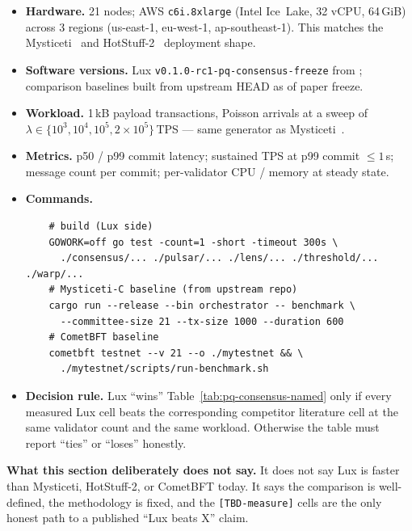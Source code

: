 \begin{itemize}[leftmargin=2em,nosep]
  \item \textbf{Hardware.} 21 nodes; AWS \texttt{c6i.8xlarge} (Intel
        Ice~Lake, 32 vCPU, 64\,GiB) across 3 regions (us-east-1, eu-west-1,
        ap-southeast-1). This matches the Mysticeti~\cite[\S6]{babel2024mysticeti}
        and HotStuff-2~\cite{malkhi2023hotstuff2} deployment shape.
  \item \textbf{Software versions.} Lux \texttt{v0.1.0-rc1-pq-consensus-freeze}
        from \cite{pulsar,thresholdgo,consensusgo,warpgo,lensgo};
        comparison baselines built from upstream HEAD as of paper freeze.
  \item \textbf{Workload.} 1\,kB payload transactions, Poisson arrivals at
        a sweep of $\lambda \in \{10^3, 10^4, 10^5, 2\!\times\!10^5\}$\,TPS
        --- same generator as Mysticeti~\cite[\S6.1]{babel2024mysticeti}.
  \item \textbf{Metrics.} p50 / p99 commit latency; sustained TPS at p99
        commit $\leq 1$\,s; message count per commit; per-validator CPU /
        memory at steady state.
  \item \textbf{Commands.}
  \begin{verbatim}
    # build (Lux side)
    GOWORK=off go test -count=1 -short -timeout 300s \
      ./consensus/... ./pulsar/... ./lens/... ./threshold/... ./warp/...
    # Mysticeti-C baseline (from upstream repo)
    cargo run --release --bin orchestrator -- benchmark \
      --committee-size 21 --tx-size 1000 --duration 600
    # CometBFT baseline
    cometbft testnet --v 21 --o ./mytestnet && \
      ./mytestnet/scripts/run-benchmark.sh
  \end{verbatim}
  \item \textbf{Decision rule.} Lux ``wins'' Table~\ref{tab:pq-consensus-named}
        only if every measured Lux cell beats the corresponding competitor
        literature cell at the same validator count and the same workload.
        Otherwise the table must report ``ties'' or ``loses'' honestly.
\end{itemize}

\noindent\textbf{What this section deliberately does not say.} It does not
say Lux is faster than Mysticeti, HotStuff-2, or CometBFT today. It says
the comparison is well-defined, the methodology is fixed, and the
\texttt{[TBD-measure]} cells are the only honest path to a published
``Lux beats X'' claim.

